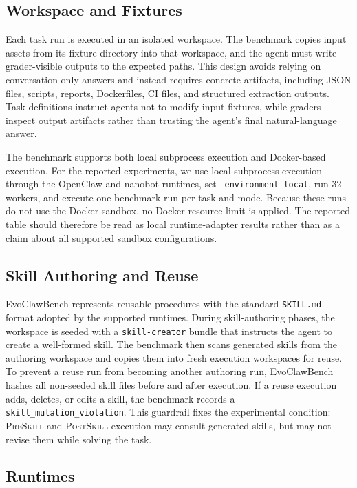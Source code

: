 \documentclass[11pt]{article}
\newcommand{\ours}{EvoClawBench}
\newcommand{\preskill}{\textsc{PreSkill}}
\newcommand{\postskill}{\textsc{PostSkill}}
\begin{document}
\subsection{Workspace and Fixtures}
\label{subsec:workspace}

Each task run is executed in an isolated workspace.
The benchmark copies input assets from its fixture directory into that workspace, and the agent must write grader-visible outputs to the expected paths.
This design avoids relying on conversation-only answers and instead requires concrete artifacts, including JSON files, scripts, reports, Dockerfiles, CI files, and structured extraction outputs.
Task definitions instruct agents not to modify input fixtures, while graders inspect output artifacts rather than trusting the agent's final natural-language answer.

The benchmark supports both local subprocess execution and Docker-based execution.
For the reported experiments, we use local subprocess execution through the OpenClaw and nanobot runtimes, set \texttt{--environment local}, run 32 workers, and execute one benchmark run per task and mode.
Because these runs do not use the Docker sandbox, no Docker resource limit is applied.
The reported table should therefore be read as local runtime-adapter results rather than as a claim about all supported sandbox configurations.

\subsection{Skill Authoring and Reuse}
\label{subsec:skills}

\ours{} represents reusable procedures with the standard \texttt{SKILL.md} format adopted by the supported runtimes.
During skill-authoring phases, the workspace is seeded with a \texttt{skill-creator} bundle that instructs the agent to create a well-formed skill.
The benchmark then scans generated skills from the authoring workspace and copies them into fresh execution workspaces for reuse. To prevent a reuse run from becoming another authoring run, \ours{} hashes all non-seeded skill files before and after execution.
If a reuse execution adds, deletes, or edits a skill, the benchmark records a \texttt{skill\_mutation\_violation}.
This guardrail fixes the experimental condition: \preskill{} and \postskill{} execution may consult generated skills, but may not revise them while solving the task.

\subsection{Runtimes}
\label{subsec:runtimes}
\end{document}
